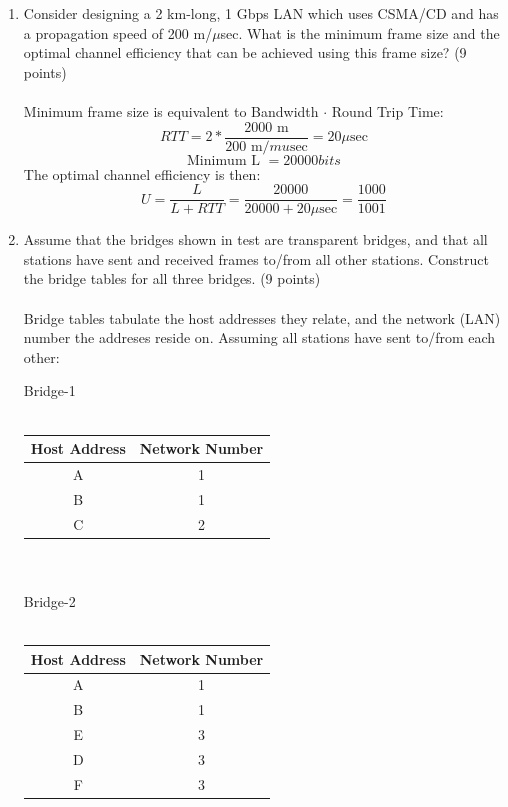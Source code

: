 \documentclass[12pt]{article}
\begin{document}
\begin{enumerate}
\newpage

\item Consider designing a 2 km-long, 1 Gbps LAN which uses CSMA/CD and has a propagation speed of 200 m/$\mu$sec. What is the minimum frame size and the optimal channel efficiency that can be achieved using this frame size? (9 points) \\ \\
Minimum frame size is equivalent to Bandwidth $\cdot$ Round Trip Time:
\[ RTT = 2 * \frac{2000 \text{ m}}{200 \text{ m/$mu$sec}} = 20 \mu\text{sec} \]
\[ \text{Minimum L } = 20000 bits\]
The optimal channel efficiency is then:
\[ U = \frac{L}{L + RTT} = \frac{20000}{20000 + 20 \mu \text{sec}} = \frac{1000}{1001} \]

\newpage 

\item Assume that the bridges shown in test are transparent bridges, and that all stations have sent and received frames to/from all other stations. Construct the bridge tables for all three bridges. (9 points) \\ \\
Bridge tables tabulate the host addresses they relate, and the network (LAN) number the addreses reside on. Assuming all stations have sent to/from each other:
\begin{center}
  Bridge-1 \\ ~\\
  \begin{tabular}{|c|c|}
    \hline
    Host Address & Network Number \\
    \hline
    A & 1 \\
    \hline
    B & 1 \\
    \hline
    C & 2 \\
    \hline
  \end{tabular} 

  ~\\ ~\\ Bridge-2 \\ ~\\ 
  \begin{tabular}{|c|c|}
    \hline
    Host Address & Network Number \\
    \hline
    A & 1 \\
    \hline
    B & 1 \\
    \hline 
    E & 3 \\
    \hline 
    D & 3 \\
    \hline
    F & 3 \\
    \hline
  \end{tabular} 


\end{center}
\end{enumerate}
\end{document}

